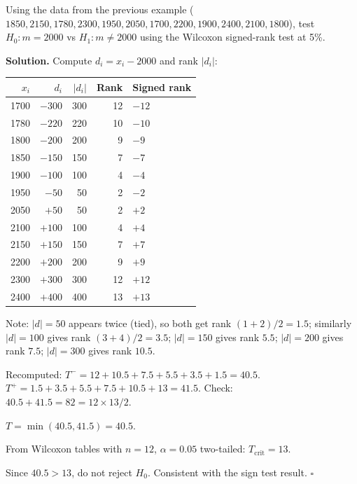 \documentclass[12pt, a4paper, oneside]{book}
\theoremstyle{definition}
\theoremstyle{plain}
\theoremstyle{remark}
\newenvironment{solution}
  {\par\medskip\noindent\textbf{Solution.}\quad}
  {\hfill$\square$\par\medskip}
\begin{document}
\begin{workedexample}
Using the data from the previous example
($1850,2150,1780,2300,1950,2050,1700,2200,1900,2400,2100,1800$),
test $H_0:m=2000$ vs $H_1:m\ne2000$ using the Wilcoxon signed-rank test
at 5\%.

\begin{solution}
Compute $d_i = x_i-2000$ and rank $|d_i|$:

\begin{center}
\begin{tabular}{rrrrl}
\toprule
$x_i$ & $d_i$ & $|d_i|$ & Rank & Signed rank \\
\midrule
1700 & $-300$ & 300 & 12 & $-12$ \\
1780 & $-220$ & 220 & 10 & $-10$ \\
1800 & $-200$ & 200 & 9  & $-9$  \\
1850 & $-150$ & 150 & 7  & $-7$  \\
1900 & $-100$ & 100 & 4  & $-4$  \\
1950 & $-50$  & 50  & 2  & $-2$  \\
2050 & $+50$  & 50  & 2  & $+2$  \\
2100 & $+100$ & 100 & 4  & $+4$  \\
2150 & $+150$ & 150 & 7  & $+7$  \\
2200 & $+200$ & 200 & 9  & $+9$  \\
2300 & $+300$ & 300 & 12 & $+12$ \\
2400 & $+400$ & 400 & 13 & $+13$ \\
\bottomrule
\end{tabular}
\end{center}

Note: $|d|=50$ appears twice (tied), so both get rank $(1+2)/2=1.5$;
similarly $|d|=100$ gives rank $(3+4)/2=3.5$; $|d|=150$ gives rank $5.5$;
$|d|=200$ gives rank $7.5$; $|d|=300$ gives rank $10.5$.

Recomputed:
$T^- = 12+10.5+7.5+5.5+3.5+1.5 = 40.5$.
$T^+ = 1.5+3.5+5.5+7.5+10.5+13 = 41.5$.
Check: $40.5+41.5=82=12\times13/2$.\ \checkmark

$T=\min(40.5,41.5)=40.5$.

From Wilcoxon tables with $n=12$, $\alpha=0.05$ two-tailed: $T_{\text{crit}}=13$.

Since $40.5 > 13$, do not reject $H_0$.  Consistent with the sign test result.
\end{solution}
\end{workedexample}
\end{document}

